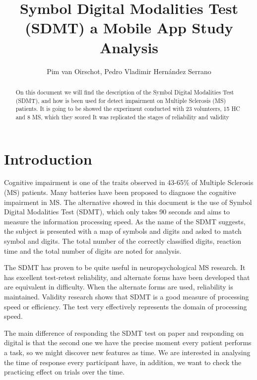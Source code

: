 \documentclass[letterpaper, 10 pt, conference]{ieeeconf}
\title{\LARGE \bf
Symbol Digital Modalities Test (SDMT) a Mobile App Study Analysis
}
\author{Pim van Oirschot, Pedro Vladimir Hern\'andez Serrano}
\begin{document}
\maketitle
\thispagestyle{empty}
\pagestyle{empty}


\begin{abstract}

On this document we will find the description of the Symbol Digital Modalities Test (SDMT), and how is been used for detect impairment on Multiple Sclerosis (MS) patients. It is going to be showed the experiment conducted with 23 volunteers, 15 HC and 8 MS, which they scored 
It was replicated the stages of reliability and validity

\end{abstract}

\section{Introduction}
\vspace{2mm}

Cognitive impairment is one of the traits observed in 43-65\% of Multiple Sclerosis (MS) patients. Many batteries have been proposed to diagnose the cognitive impairment in MS. The alternative showed in this document is the use of Symbol Digital Modalities Test (SDMT), which only takes 90 seconds and aims to measure the information processing speed. As the name of the SDMT suggests, the subject is presented with a map of symbols and digits and asked to match symbol and digits. The total number of the correctly classified digits, reaction time and the total number of digits are noted for analysis.

The SDMT has proven to be quite useful in neuropsychological MS research. It has excellent test-retest reliability, and alternate forms have been developed that are equivalent in difficulty. When the alternate forms are used, reliability is maintained. Validity research shows that SDMT is a good measure of processing speed or efficiency. The test very effectively represents the domain of processing speed.

The main difference of responding the SDMT test on paper and responding on digital is that the second one we have the precise moment every patient performs a task, so we might discover new features as time. We are interested in analysing the time of response every participant have, in addition, we want to check the practicing effect on trials over the time.
\end{document}
